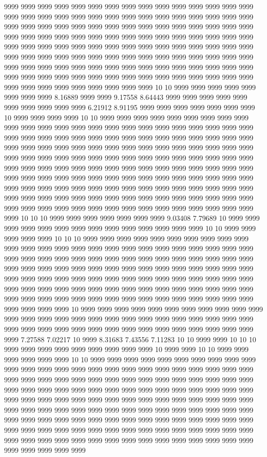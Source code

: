 9999 9999 9999 9999 9999 9999 9999 9999 9999 9999 9999 9999 9999 9999 9999 9999 9999 9999 9999 9999 9999 9999 9999 9999 9999 9999 9999 9999 9999 9999 9999 9999 9999 9999 9999 9999 9999 9999 9999 9999 9999 9999 9999 9999 9999 9999 9999 9999 9999 9999 9999 9999 9999 9999 9999 9999 9999 9999 9999 9999 9999 9999 9999 9999 9999 9999 9999 9999 9999 9999 9999 9999 9999 9999 9999 9999 9999 9999 9999 9999 9999 9999 9999 9999 9999 9999 9999 9999 9999 9999 9999 9999 9999 9999 9999 9999 9999 9999 9999 9999 9999 9999 9999 9999 9999 9999 9999 9999 9999 9999 9999 9999 9999 9999 9999 9999 9999 9999 9999 9999 9999 9999 9999 9999 9999 9999 9999 9999 9999 10 10 9999 9999 9999 9999 9999 9999 9999 9999 8.16889 9999 9999 9.17558 8.64443 9999 9999 9999 9999 9999 9999 9999 9999 9999 9999 6.21912 8.91195 9999 9999 9999 9999 9999 9999 9999 10 9999 9999 9999 9999 10 10 9999 9999 9999 9999 9999 9999 9999 9999 9999 9999 9999 9999 9999 9999 9999 9999 9999 9999 9999 9999 9999 9999 9999 9999 9999 9999 9999 9999 9999 9999 9999 9999 9999 9999 9999 9999 9999 9999 9999 9999 9999 9999 9999 9999 9999 9999 9999 9999 9999 9999 9999 9999 9999 9999 9999 9999 9999 9999 9999 9999 9999 9999 9999 9999 9999 9999 9999 9999 9999 9999 9999 9999 9999 9999 9999 9999 9999 9999 9999 9999 9999 9999 9999 9999 9999 9999 9999 9999 9999 9999 9999 9999 9999 9999 9999 9999 9999 9999 9999 9999 9999 9999 9999 9999 9999 9999 9999 9999 9999 9999 9999 9999 9999 9999 9999 9999 9999 9999 9999 9999 9999 9999 9999 9999 9999 9999 9999 9999 9999 9999 9999 9999 9999 9999 9999 9999 9999 9999 9999 9999 9999 9999 9999 9999 9999 10 10 10 9999 9999 9999 9999 9999 9999 9999 9.03408 7.79689 10 9999 9999 9999 9999 9999 9999 9999 9999 9999 9999 9999 9999 9999 9999 10 10 9999 9999 9999 9999 9999 10 10 10 9999 9999 9999 9999 9999 9999 9999 9999 9999 9999 9999 9999 9999 9999 9999 9999 9999 9999 9999 9999 9999 9999 9999 9999 9999 9999 9999 9999 9999 9999 9999 9999 9999 9999 9999 9999 9999 9999 9999 9999 9999 9999 9999 9999 9999 9999 9999 9999 9999 9999 9999 9999 9999 9999 9999 9999 9999 9999 9999 9999 9999 9999 9999 9999 9999 9999 9999 9999 9999 9999 9999 9999 9999 9999 9999 9999 9999 9999 9999 9999 9999 9999 9999 9999 9999 9999 9999 9999 9999 9999 9999 9999 9999 9999 9999 9999 9999 9999 9999 9999 9999 9999 9999 9999 10 9999 9999 9999 9999 9999 9999 9999 9999 9999 9999 9999 9999 9999 9999 9999 9999 9999 9999 9999 9999 9999 9999 9999 9999 9999 9999 9999 9999 9999 9999 9999 9999 9999 9999 9999 9999 9999 9999 9999 9999 9999 9999 7.27588 7.02217 10 9999 8.31683 7.43556 7.11283 10 10 9999 9999 10 10 10 9999 9999 9999 9999 9999 9999 9999 9999 9999 10 9999 9999 10 10 9999 9999 9999 9999 9999 9999 10 10 9999 9999 9999 9999 9999 9999 9999 9999 9999 9999 9999 9999 9999 9999 9999 9999 9999 9999 9999 9999 9999 9999 9999 9999 9999 9999 9999 9999 9999 9999 9999 9999 9999 9999 9999 9999 9999 9999 9999 9999 9999 9999 9999 9999 9999 9999 9999 9999 9999 9999 9999 9999 9999 9999 9999 9999 9999 9999 9999 9999 9999 9999 9999 9999 9999 9999 9999 9999 9999 9999 9999 9999 9999 9999 9999 9999 9999 9999 9999 9999 9999 9999 9999 9999 9999 9999 9999 9999 9999 9999 9999 9999 9999 9999 9999 9999 9999 9999 9999 9999 9999 9999 9999 9999 9999 9999 9999 9999 9999 9999 9999 9999 9999 9999 9999 9999 9999 9999 9999 9999 9999 9999 9999 9999 9999 9999 9999 9999 9999 9999 9999 9999 9999 9999 9999 